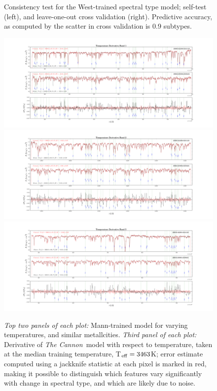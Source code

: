 \documentclass[modern]{aastex62}
\newcommand{\thecannon}{\textsl{The Cannon}}
\begin{document}
\begin{figure}[ht]
\begin{center}
\end{center}
\caption{Consistency test for the West-trained spectral type model; self-test (left), and leave-one-out cross validation (right).  Predictive accuracy, as computed by the scatter in cross validation is 0.9 subtypes.} \label{fig:west_validation}
\end{figure}

\begin{figure}[ht]
\begin{center}
\includegraphics[width=16cm]{figures/demo_derivatives_teff1.png}
\includegraphics[width=16cm]{figures/demo_derivatives_teff2.png}
\includegraphics[width=16cm]{figures/demo_derivatives_teff3.png}
\end{center}
\caption{\textit{Top two panels of each plot:} Mann-trained model for varying temperatures, and similar metallcities. \textit{Third panel of each plot:} Derivative of \thecannon\ model with respect to temperature, taken at the median training temperature, T$_{\rm eff}=3463$K; error estimate computed using a jackknife statistic at each pixel is marked in red, making it possible to distinguish which features vary significantly with change in spectral type, and which are likely due to noise.} \label{fig:demo_teff}
\end{figure}
\end{document}
